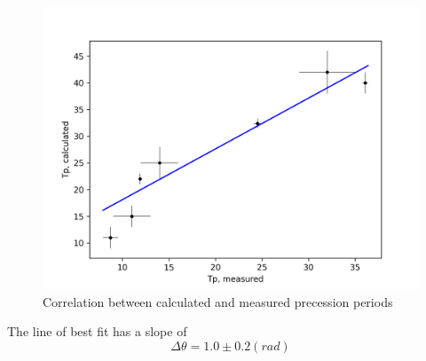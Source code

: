 \begin{multicols}{2}
\begin{figure}[H]
    \centering
    \includegraphics[width=\columnwidth]{gyroscope/images/gyro}
    \caption{Correlation between calculated and measured precession periods}
    \label{fig:gyro}
\end{figure}

The line of best fit has a slope of
\begin{equation}
  \label{eq:results:slope}
  \Delta \theta = 1.0 \pm 0.2 (rad)
\end{equation}

\end{multicols}
